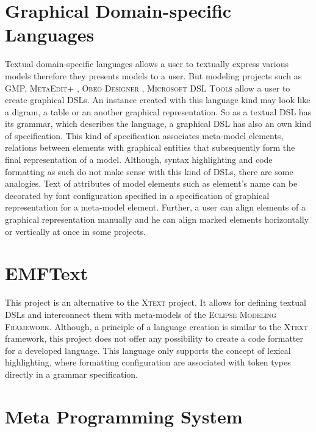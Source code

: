 \documentclass[12pt,notitlepage,a4paper]{report}
\begin{document}
\section{Graphical Domain-specific Languages}
Textual domain-specific languages allows a user to textually express various models therefore they presents models to a user.  But modeling projects such as GMP\cite{GMP}, \textsc{MetaEdit+} \cite{MetaEdit}, \textsc{Obeo Designer} \cite{ObeoDesigner}, \textsc{Microsoft DSL Tools} \cite{DslTools} allow a user to create graphical DSLs. An instance created with this language kind may look like a digram, a table or an another graphical representation. So as a textual DSL has its grammar, which describes the language, a graphical DSL has also an own kind of specification.  This kind of specification associates meta-model elements, relations between elements with graphical entities that subsequently form the final representation of a model. Although, syntax highlighting and code formatting as  such do not make sense with this kind of DSLs, there are some analogies. Text of attributes of model elements such as element's name can be decorated by font configuration specified in a specification of graphical representation for a meta-model element. Further, a user can align elements of a graphical representation manually and he can align  marked elements horizontally or vertically at once  in some projects.

\section{EMFText}

This project \cite{EMFText} is an alternative to the \textsc{Xtext} project. It allows for defining textual DSLs and interconnect them with meta-models of the \textsc{Eclipse Modeling Framework}. Although, a principle of a language creation is similar to the \textsc{Xtext} framework, this project does not offer any possibility to create a code formatter for a developed language.  This language only supports the concept of lexical highlighting, where formatting configuration are associated with token types directly in a grammar specification.

\section{Meta Programming System}
\end{document}
